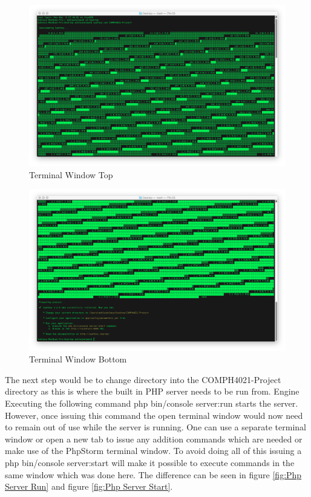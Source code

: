 \begin{figure}[htbp]
   \centering
   \includegraphics[width=400pt]{figures/terminal_window_top.png} %
   \caption{Terminal Window Top}
   \label{fig:Terminal Window Top}
\end{figure}

\begin{figure}[htbp]
   \centering
   \includegraphics[width=400pt]{figures/terminal_window_bottom.png} %
   \caption{Terminal Window Bottom}
   \label{fig:Terminal Window Bottom}
\end{figure}

The next step would be to change directory into the COMPH4021-Project directory as this is where the built in PHP server needs to be run from. Engine Executing the following command php bin/console server:run starts the server. However, once issuing this command the open terminal window would now need to remain out of use while the server is running. One can use a separate terminal window or open a new tab to issue any addition commands which are needed or make use of the PhpStorm terminal window. To avoid doing all of this issuing a php bin/console server:start will make it possible to execute commands in the same window which was done here. The difference can be seen in figure \ref{fig:Php Server Run} and figure \ref{fig:Php Server Start}.


